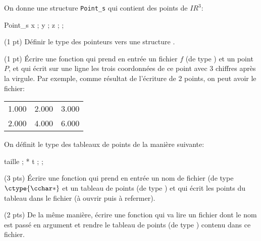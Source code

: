 
On donne une structure \texttt{Point\_s} qui contient des points de
$I\!R^3$:
\begin{Ccode}
  \ctab \cstruct Point\_s \lb
  \ctab \cfloat x ;
  \ctab \cfloat y ;
  \ctab \cfloat z ;
  \ctab \rb ;
\end{Ccode}


\question (1 pt) D{\'e}finir le type  des pointeurs vers une
structure .

\question (1 pt) {\'E}crire une fonction qui prend en entr{\'e}e un fichier
$f$ (de type ) et un point $P$, et qui {\'e}crit sur une
ligne les trois coordonn{\'e}es de ce point avec 3 chiffres apr{\`e}s la
virgule. Par exemple, comme r{\'e}sultat de l'{\'e}criture de 2 points, on
peut avoir le fichier:
\begin{center}
  \begin{tabular}{lll}
    1.000 & 2.000 & 3.000\\
    2.000 & 4.000 & 6.000\\
  \end{tabular}
\end{center}

On d{\'e}finit le type des tableaux de points de la mani{\`e}re suivante:
\begin{Ccode}
  \ctab{} \ctypedef \cstruct {}\lb
  \ctab \cint taille ;
  \ctab {} * t ;
  \ctab \rb *  ;
\end{Ccode}

\question (3 pts) {\'E}crire une fonction qui prend en entr{\'e}e un nom de
fichier (de type $\ctype{\cchar *}$ et un tableau de points (de type
) et qui {\'e}crit les points du tableau dans le fichier ({\`a}
ouvrir puis {\`a} refermer).

\question (2 pts) De la m{\^e}me mani{\`e}re, {\'e}crire une fonction qui va lire
un fichier dont le nom est pass{\'e} en argument et rendre le tableau de
points (de type ) contenu dans ce fichier.
